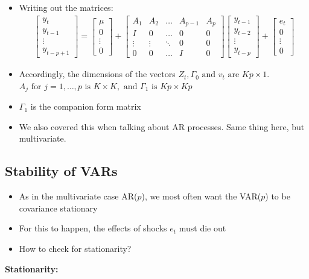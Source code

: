 \documentclass[10pt]{article}
\begin{document}
\begin{itemize}
    \item Writing out the matrices: 
    \begin{gather*}
        \begin{bmatrix}
            y_t \\ y_{t - 1} \\\vdots \\ y_{t - p + 1}
        \end{bmatrix}
        = 
        \begin{bmatrix}
            \mu \\ 0 \\\vdots \\ 0
        \end{bmatrix}
        +
        \begin{bmatrix}
            A_1 & A_2 & \dots & A_{p - 1} & A_p\\
            I & 0 & \dots & 0 & 0\\
            \vdots & \vdots & \ddots & 0 & 0\\
            0 & 0 & \dots & I & 0
        \end{bmatrix}
        \begin{bmatrix}
            y_{t - 1}\\ y_{t - 2} \\\vdots \\ y_{t - p}
        \end{bmatrix}
        +
        \begin{bmatrix}
            e_t \\ 0 \\ \vdots \\ 0
        \end{bmatrix}
    \end{gather*}
    \item Accordingly, the dimensions of the vectors $Z_t, \Gamma_0 \text{ and } v_t \text{ are } Kp\times 1 $. $A_j \text{ for } j = 1,\dots, p \text{ is } K\times K, \text{ and } \Gamma_1 \text{ is } Kp\times Kp $
    \item $\Gamma_1 $ is the companion form matrix 
    \item We also covered this when talking about AR processes. Same thing here, but multivariate.
\end{itemize}
\subsection{Stability of VARs}
\begin{itemize}
    \item As in the multivariate case AR($p $), we most often want the VAR($p $) to be covariance stationary
    \item For this to happen, the effects of shocks $e_t $ must die out 
    \item How to check for stationarity?
\end{itemize}
\textbf{Stationarity:}
\end{document}
